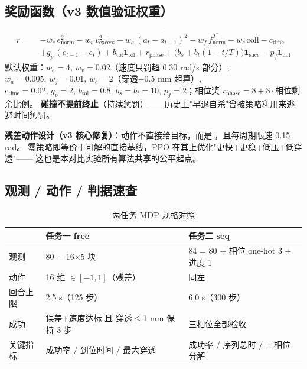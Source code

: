 \subsection{奖励函数（v3 数值验证权重）}
\begin{align*}
r =\;& -w_e\,\overline{e_{\mathrm{norm}}^2} - w_v\,\overline{v_{\mathrm{excess}}^2}
      - w_a\,\overline{(a_t - a_{t-1})^2} - w_f\,\overline{f_{\mathrm{norm}}^2}
      - w_c\,\mathrm{coll} - c_{\mathrm{time}} \\
    & + g_p\,(\bar e_{t-1} - \bar e_t) + b_{\mathrm{tol}}\mathbf{1}_{\mathrm{tol}}
      + r_{\mathrm{phase}} + \big(b_s + b_t(1 - t/T)\big)\mathbf{1}_{\mathrm{succ}}
      - p_f\mathbf{1}_{\mathrm{fail}}
\end{align*}
默认权重：$w_e{=}4,\,w_v{=}0.02$（速度只罚超 0.30 rad/s 部分）,\,$w_a{=}0.005,\,w_f{=}0.01,\,w_c{=}2$（穿透$-$0.5 mm 起算）,
$c_{\mathrm{time}}{=}0.02,\,g_p{=}2,\,b_{\mathrm{tol}}{=}0.8,\,b_s{=}b_t{=}10,\,p_f{=}2$；相位奖 $r_{\mathrm{phase}}{=}8{+}8\cdot$相位剩余比例。
\textbf{碰撞不提前终止}（持续惩罚）——历史上"早退自杀"曾被策略利用来逃避时间惩罚。

\begin{keybox}
\textbf{残差动作设计（v3 核心修复）}：动作不直接给目标，而是
，且每周期限速 0.15 rad。
零策略即等价于可解的直接基线，PPO 在其上优化"更快+更稳+低压+低穿透"——
这也是本对比实验所有算法共享的公平起点。
\end{keybox}

\subsection{观测 / 动作 / 判据速查}
\begin{table}[h]\centering
\caption{两任务 MDP 规格对照}\label{tab:mdp}
\begin{tabular}{lll}
\toprule
 & 任务一 free & 任务二 seq \\
\midrule
观测 & 80 = 16$\times$5 块 & 84 = 80 + 相位 one-hot 3 + 进度 1 \\
动作 & 16 维 $\in[-1,1]$（残差） & 同左 \\
回合上限 & 2.5 s（125 步） & 6.0 s（300 步） \\
成功 & 误差+速度达标 且 穿透$\le$1 mm 保持 3 步 & 三相位全部验收 \\
关键指标 & 成功率 / 到位时间 / 最大穿透 & 成功率 / 序列总时 / 三相位分解 \\
\bottomrule
\end{tabular}
\end{table}

